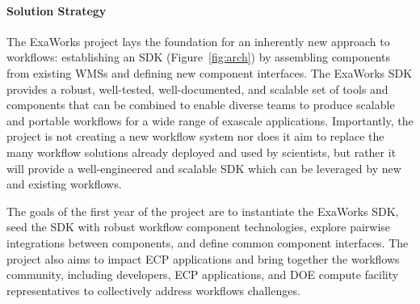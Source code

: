 \paragraph{Solution Strategy}
The ExaWorks project lays the foundation for an inherently
new approach to workflows: establishing an SDK (Figure~\ref{fig:arch}) 
by assembling components from existing WMSs
and defining new component interfaces. 
The ExaWorks SDK provides a robust, well-tested, well-documented,
and scalable set of tools and components that can be combined to enable diverse teams to
produce scalable and portable workflows for a wide range of exascale
applications. Importantly, the project is not creating a new workflow system
nor does it aim to replace the many workflow solutions already deployed
and used by scientists, but rather it will provide a well-engineered and
scalable SDK which can be leveraged by new and existing workflows.




The goals of the first year of the project are to instantiate the ExaWorks SDK, seed the SDK with
robust workflow component technologies, explore pairwise integrations between components, and define
common component interfaces.  The project also aims to impact ECP applications and
bring together the workflows community, including developers, ECP applications, and DOE compute facility representatives
to collectively address workflows challenges.

